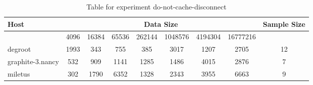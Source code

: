 \begin{table}
\caption{Table for experiment do-not-cache-disconnect}
\begin{tabular}{@{}lcccccccc@{}}
\toprule
Host    & \multicolumn{7}{c}{Data Size}          & Sample Size \\ \midrule
& 4096  & 16384  & 65536  & 262144  & 1048576  & 4194304  & 16777216              \\ \midrule
degroot  & 1993  & 343  & 755  & 385  & 3017  & 1207  & 2705  & 12 \\
graphite-3.nancy  & 532  & 909  & 1141  & 1285  & 1486  & 4015  & 2876  & 7 \\
miletus  & 302  & 1790  & 6352  & 1328  & 2343  & 3955  & 6663  & 9 \\
\bottomrule
\end{tabular}
\end{table}